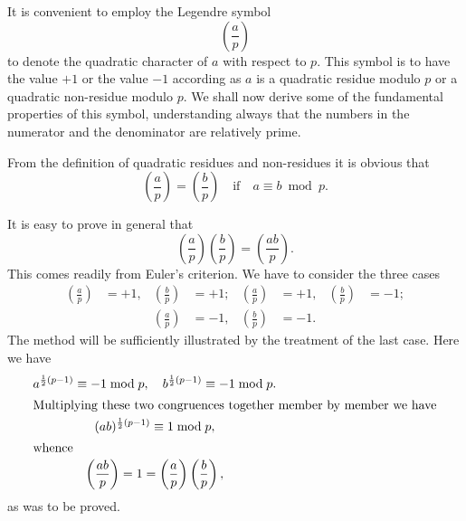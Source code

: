 \documentclass[oneside]{book}
\begin{document}
It is convenient to employ the Legendre symbol
\begin{equation*}
\left( \frac{a}{p} \right )
\end{equation*}
to denote the quadratic character of $a$ with respect to $p$.%
 This symbol is to have the value $+1$ or the
value $-1$ according as $a$ is a quadratic residue modulo $p$ or a
quadratic non-residue modulo $p$. We shall now derive some of the
fundamental properties of this symbol, understanding always that the
numbers in the numerator and the denominator are relatively prime.

From the definition of quadratic residues and non-residues it is
obvious that
\begin{equation}
\left ( \frac{a}{p} \right ) = \left ( \frac{b}{p} \right )
   \quad \text{if}\quad a \equiv b \bmod p. \tag{1}
\end{equation}

It is easy to prove in general that
\begin{equation}
\left ( \frac{a}{p} \right ) \left ( \frac{b}{p} \right ) =
  \left (\frac {ab}{p} \right ). \tag{2}
\end{equation}
This comes readily from Euler's criterion. We have to consider the
three cases
\begin{align*}
\left( \frac{a}{p} \right )    &=+1,&
  \left( \frac{b}{p} \right )  &=+1; &
\left( \frac{a}{p} \right )    &=+1,&
  \left( \frac{b}{p} \right )  &=-1;  \\
&& \left( \frac{a}{p} \right ) &=-1,&
  \left( \frac{b}{p} \right )  &=-1.
\end{align*}
The method will be sufficiently illustrated by the treatment
of the last case. Here we have
\begin{gather*}
a^{\frac 12 (p-1)}\equiv -1 \bmod p,\quad
   b^{\frac 12 (p-1)}\equiv -1 \bmod p. \\
\intertext{Multiplying these two congruences together member by
member we have}
(ab)^{\frac 12 (p-1)} \equiv 1 \bmod p, \\
\intertext{whence}
\left( \frac {ab}{p} \right ) = 1 =
  \left( \frac ap \right ) \left( \frac bp \right ),
\end{gather*}
as was to be proved.
\end{document}
